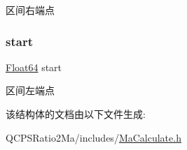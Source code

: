 区间右端点 

\mbox{\label{struct_interval_a32be7f9967586b049961daa00b62069c}} 
\subsubsection{\texorpdfstring{start}{start}}
{\footnotesize\ttfamily \mbox{\hyperlink{_type_and_consts_8h_a3f1431cb9f76da10f59246d1d743dc2c}{Float64}} start}



区间左端点 



该结构体的文档由以下文件生成\+:\begin{DoxyCompactItemize}
\item 
Q\+C\+P\+S\+Ratio2\+Ma/includes/\mbox{\hyperlink{_ma_calculate_8h}{Ma\+Calculate.\+h}}\end{DoxyCompactItemize}
